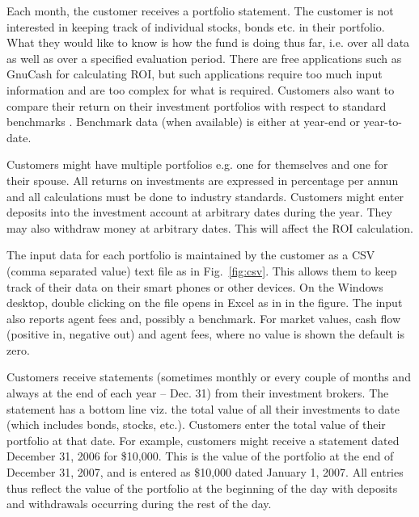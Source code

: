 \documentclass[runningheads,12pt]{article}
\begin{document}
Each month, the customer receives a portfolio statement. The customer is not interested in keeping track of individual stocks, bonds etc. in their portfolio. What they would like to know is how the fund is doing thus far, i.e. over all data as well as over a specified evaluation period. There are free applications such as GnuCash for calculating ROI, but such applications require too much input information and are too complex for what is required. Customers also want to compare their return on their investment portfolios with respect to standard benchmarks \cite{gips,Lawton09}. Benchmark data (when available) is either at year-end or year-to-date.

Customers might have multiple portfolios e.g. one for themselves and one for their spouse. All returns on investments are expressed in percentage per annun and all calculations must be done to industry standards. Customers might enter deposits into the investment account at arbitrary dates during the year. They may also withdraw money at arbitrary dates. This will affect the ROI calculation.

The input data for each portfolio is maintained by the customer as a CSV (comma separated value) text file as in Fig.~\ref{fig:csv}. This allows them to keep track of their data on their smart phones or other devices. On the Windows desktop, double clicking on the file opens in Excel as in in the figure. The input also reports agent fees and, possibly a benchmark. For market values, cash flow (positive in, negative out) and agent fees, where no value is shown the default is zero.

Customers receive statements (sometimes monthly or every couple of months and always at the end of each year – Dec. 31) from their investment brokers. The statement has a bottom line viz. the total value of all their investments to date (which includes bonds, stocks, etc.). Customers enter the total value of their portfolio at that date. For example, customers might receive a statement dated December 31, 2006 for \$10,000. This is the value of the portfolio at the end of December 31, 2007, and is entered as \$10,000 dated January 1, 2007. All entries thus reflect the value of the portfolio at the beginning of the day with deposits and withdrawals occurring during the rest of the day. 
\end{document}
